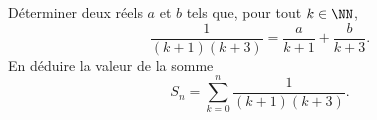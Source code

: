 %
%
Déterminer deux réels $a$ et $b$ tels que, pour tout $k\in \NN$,
$$\frac 1{(k+1)(k+3)}=\frac a{k+1}+\frac b{k+3}.$$
En déduire la valeur de la somme
$$S_n=\sum_{k=0}^n \frac{1}{(k+1)(k+3)}.$$
